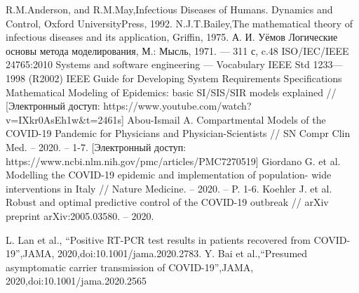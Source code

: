 \begin{biblio}
R.M.Anderson, and R.M.May,Infectious Diseases of Humans. Dynamics and Control, Oxford UniversityPress, 1992.
 N.J.T.Bailey,The mathematical theory of infectious diseases and its application, Griffin, 1975.
А. И. Уёмов Логические основы метода моделирования, М.: Мысль, 1971. — 311 с, c.48
ISO/IEC/IEEE 24765:2010 Systems and software engineering — Vocabulary
IEEE Std 1233—1998 (R2002) IEEE Guide for Developing System Requirements Specifications
Mathematical Modeling of Epidemics: basic SI/SIS/SIR models explained // [Электронный доступ: https://www.youtube.com/watch?v=IXkr0AsEh1w\&t=2461s]
 Abou-Ismail A. Compartmental Models of the COVID-19 Pandemic for Physicians and
Physician-Scientists  //  SN  Compr  Clin  Med.  –  2020.  –  1-7.  [Электронный  доступ:
https://www.ncbi.nlm.nih.gov/pmc/articles/PMC7270519]
 Giordano G. et al. Modelling the COVID-19 epidemic and implementation of population-
wide interventions in Italy // Nature Medicine. – 2020. – P. 1-6.
 Koehler  J.  et  al.  Robust  and  optimal  predictive  control  of  the  COVID-19  outbreak  //
arXiv preprint arXiv:2005.03580. – 2020.

 L.  Lan  et  al.,   “Positive  RT-PCR  test  results  in  patients  recovered  from  COVID-19”,JAMA,  2020,doi:10.1001/jama.2020.2783.
 Y.    Bai    et    al.,“Presumed    asymptomatic    carrier    transmission    of    COVID-19”,JAMA,    2020,doi:10.1001/jama.2020.2565
\end{biblio} 
